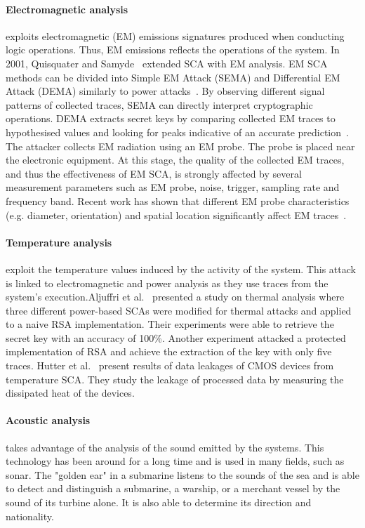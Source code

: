 \paragraph{Electromagnetic analysis} exploits electromagnetic (EM) emissions signatures produced when conducting logic operations. Thus, EM emissions reflects the operations of the system. In 2001, Quisquater and Samyde~\cite{QS-01-scps} extended SCA with EM analysis.
EM SCA methods can be divided into Simple EM Attack (SEMA) and Differential EM Attack (DEMA) similarly to power attacks~\cite{ANM-19-di}. By observing different signal patterns of collected traces, SEMA can directly interpret cryptographic operations. DEMA extracts secret keys by comparing collected EM traces to hypothesised values and looking for peaks indicative of an accurate prediction~\cite{HGTVJ-22-dt}.
The attacker collects EM radiation using an EM probe. The probe is placed near the electronic equipment. At this stage, the quality of the collected EM traces, and thus the effectiveness of EM SCA, is strongly affected by several measurement parameters such as EM probe, noise, trigger, sampling rate and frequency band. Recent work has shown that different EM probe characteristics (e.g. diameter, orientation) and spatial location significantly affect EM traces~\cite{HMHSS-12-tcrypo,KSTO-17-iccad, WDL-16-ntms}.

\paragraph{Temperature analysis} exploit the temperature values induced by the activity of the system. This attack is linked to electromagnetic and power analysis as they use traces from the system's execution.Aljuffri et al.~\cite{AZRHT-21-tvlsi} presented a study on thermal analysis where three different power-based SCAs were modified for thermal attacks and applied to a naive RSA implementation. Their experiments were able to retrieve the secret key with an accuracy of 100\%. Another experiment attacked a protected implementation of RSA and achieve the extraction of the key with only five traces. Hutter et al.~\cite{HS-14-cardis} present results of data leakages of CMOS devices from temperature SCA. They study the leakage of processed data by measuring the dissipated heat of the devices.

\paragraph{Acoustic analysis} takes advantage of the analysis of the sound emitted by the systems. This technology has been around for a long time and is used in many fields, such as sonar. The "golden ear" in a submarine listens to the sounds of the sea and is able to detect and distinguish a submarine, a warship, or a merchant vessel by the sound of its turbine alone. It is also able to determine its direction and nationality.

